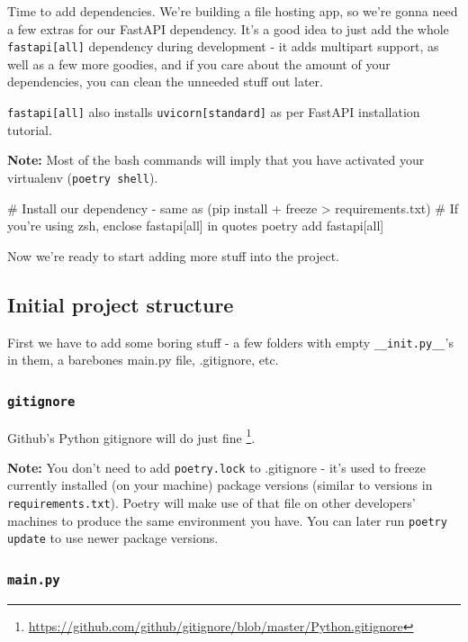 \documentclass[14pt]{extarticle}
\newcommand{\flink}[1]{\footnote{\href{#1}{#1}}}
\newcommand{\note}{\textbf{\color{red}Note: }}
\newcommand{\bashinline}[1]{\lstinline[language=bash, style=cstyle, morekeywords={poetry, git, mv, python, uvicorn}, basicstyle=\ttfamily\normalsize]{#1}}
\begin{document}
Time to add dependencies. We're building a file hosting app, so we're gonna need a few extras for our FastAPI dependency. It's a good idea to just add the whole \texttt{fastapi[all]} dependency during development - it adds multipart support, as well as a few more goodies, and if you care about the amount of your dependencies, you can clean the unneeded stuff out later.

\texttt{fastapi[all]} also installs \texttt{uvicorn[standard]} as per FastAPI installation tutorial.

\note Most of the bash commands will imply that you have activated your virtualenv (\bashinline{poetry shell}).

\begin{bashcode}
    # Install our dependency - same as (pip install + freeze > requirements.txt)
    # If you're using zsh, enclose fastapi[all] in quotes
    poetry add fastapi[all]
\end{bashcode}

Now we're ready to start adding more stuff into the project.

\subsection{Initial project structure}

First we have to add some boring stuff - a few folders with empty \texttt{\_\_init.py\_\_}'s in them, a barebones main.py file, .gitignore, etc.

\subsubsection{\texttt{gitignore}}

Github's Python gitignore will do just fine \flink{https://github.com/github/gitignore/blob/master/Python.gitignore}.

\note You don't need to add \texttt{poetry.lock} to .gitignore - it's used to freeze currently installed (on your machine) package versions (similar to versions in \texttt{requirements.txt}). Poetry will make use of that file on other developers' machines to produce the same environment you have. You can later run \bashinline{poetry update} to use newer package versions.

\subsubsection{\texttt{main.py}}
\end{document}
